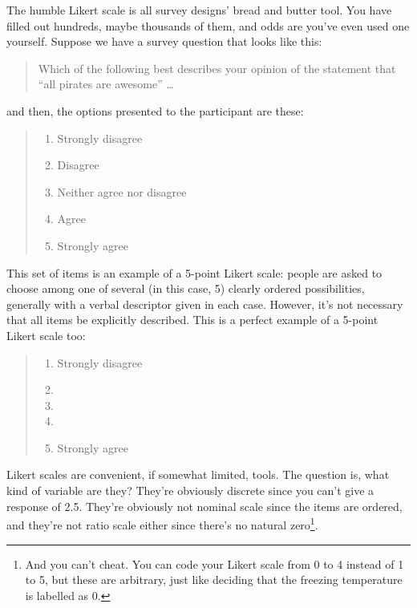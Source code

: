 \documentclass[
  11pt,
]{book}
\providecommand{\tightlist}{%
  \setlength{\itemsep}{0pt}\setlength{\parskip}{0pt}}
\theoremstyle{definition}
\theoremstyle{definition}
\theoremstyle{definition}
\theoremstyle{definition}
\theoremstyle{remark}
\begin{document}
The humble Likert scale is all survey designs' bread and butter tool. You have filled out hundreds, maybe thousands of them, and odds are you've even used one yourself. Suppose we have a survey question that looks like this:

\begin{quote}
Which of the following best describes your opinion of the statement that ``all pirates are awesome'' \ldots{}
\end{quote}

and then, the options presented to the participant are these:

\begin{quote}
\begin{enumerate}
\def\labelenumi{(\arabic{enumi})}
\tightlist
\item
  Strongly disagree
\item
  Disagree
\item
  Neither agree nor disagree
\item
  Agree
\item
  Strongly agree
\end{enumerate}
\end{quote}

This set of items is an example of a 5-point Likert scale: people are asked to choose among one of several (in this case, 5) clearly ordered possibilities, generally with a verbal descriptor given in each case. However, it's not necessary that all items be explicitly described. This is a perfect example of a 5-point Likert scale too:

\begin{quote}
\begin{enumerate}
\def\labelenumi{(\arabic{enumi})}
\tightlist
\item
  Strongly disagree
\item
\item
\item
\item
  Strongly agree
\end{enumerate}
\end{quote}

Likert scales are convenient, if somewhat limited, tools. The question is, what kind of variable are they? They're obviously discrete since you can't give a response of 2.5. They're obviously not nominal scale since the items are ordered, and they're not ratio scale either since there's no natural zero\footnote{And you can't cheat. You can code your Likert scale from 0 to 4 instead of 1 to 5, but these are arbitrary, just like deciding that the freezing temperature is labelled as 0.}.
\end{document}
